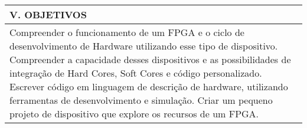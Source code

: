 \documentclass[12pt]{article}
\begin{document}
\newpage



\begin{longtable}{|L{1.025\textwidth}|} \hline
%
{\bf V. OBJETIVOS } \\ \hline

Compreender o funcionamento de um FPGA e o ciclo de desenvolvimento de Hardware utilizando esse tipo de dispositivo. 
Compreender a capacidade desses dispositivos e as possibilidades de integração de Hard Cores, Soft Cores e código personalizado. Escrever código em linguagem de descrição de hardware, utilizando ferramentas de desenvolvimento e simulação.
Criar um pequeno projeto de dispositivo que explore os recursos de um FPGA.

\\ \hline
\end{longtable}
\end{document}
